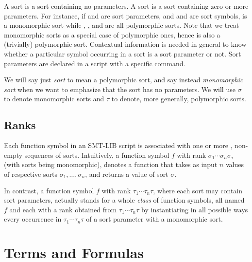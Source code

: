 \begin{newver}
A  sort is a sort containing no parameters.
A  sort is a sort containing zero or more parameters.
For instance, if  and  are sort parameters,
and  and  are sort symbols,
 is a monomorphic sort 
while , , and  are
all polymorphic sorts.
Note that we treat monomorphic sorts as a special case of polymorphic ones,
hence  is also a (trivially) polymorphic sort.
Contextual information is needed in general to know whether a particular symbol
occurring in a sort is a sort parameter or not.
Sort parameters are declared in a script with a specific command.

We will say just \emph{sort} to mean a polymorphic sort, and 
say instead \emph{monomorphic sort} when we want to emphasize 
that the sort has no parameters. 
We will use $\sigma$ to denote monomorphic sorts and 
$\tau$ to denote, more generally, polymorphic sorts.
\end{newver}

\subsection{Ranks}

Each function symbol in an SMT-LIB script is associated with one or more 
, non-empty sequences of sorts.
Intuitively, a function symbol $f$ with rank $\sigma_1\cdots\sigma_n\sigma$,
(with sorts being monomorphic),
denotes a function that takes as input $n$ values of respective sorts
$\sigma_1, \ldots, \sigma_n$,
and returns a value of sort $\sigma$.

In contrast, a function symbol $f$ with rank $\tau_1\cdots\tau_n\tau$,
where each sort may contain sort parameters,
actually stands for a whole \emph{class} of function symbols, 
all named $f$ and each with a rank obtained from $\tau_1\cdots\tau_n\tau$ 
by instantiating in all possible ways every occurrence in $\tau_1\cdots\tau_n\tau$
of a sort parameter with a monomorphic sort.


\section{Terms and Formulas} \label{sec:concrete-terms}


